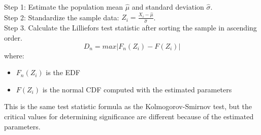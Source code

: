 \documentclass[preview]{standalone}
\begin{document}
Step 1: Estimate the population mean $\hat{\mu}$ and standard deviation $\hat{\sigma}$.\\
Step 2: Standardize the sample data: $Z_i=\frac{X_i-\hat{\mu}}{\hat{\sigma}}$.\\
Step 3. Calculate the Lilliefors test statistic after sorting the sample in ascending order.
{\Large
\[
D_n=max|F_n(Z_i)-F(Z_i)|
\]
}
where:
\begin{itemize}
	\setlength\itemsep{0.1em}
	\item $F_n(Z_i)$ is the EDF
	\item $F(Z_i)$ is the normal CDF computed with the estimated parameters
\end{itemize}
This is the same test statistic formula as the Kolmogorov-Smirnov test, but the critical values for determining significance are different because of the estimated parameters.
\end{document}
